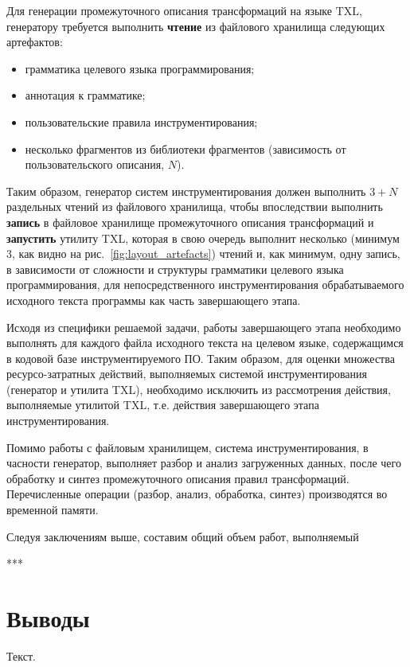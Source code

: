 Для генерации промежуточного описания трансформаций на языке TXL, генератору требуется выполнить \textbf{чтение} из файлового хранилища следующих артефактов:
\begin{itemize}
  \item грамматика целевого языка программирования;
  \item аннотация к грамматике;
  \item пользовательские правила инструментирования;
  \item несколько фрагментов из библиотеки фрагментов (зависимость от пользовательского описания, $N$).
\end{itemize}

Таким образом, генератор систем инструментирования должен выполнить $3 + N$ раздельных чтений из файлового хранилища, чтобы впоследствии выполнить \textbf{запись} в файловое хранилище промежуточного описания трансформаций и \textbf{запустить} утилиту TXL, которая в свою очередь выполнит несколько (минимум $3$, как видно на рис.~\ref{fig:layout_artefacts}) чтений и, как минимум, одну запись, в зависимости от сложности и структуры грамматики целевого языка программирования, для непосредственного инструментирования обрабатываемого исходного текста программы как часть завершающего этапа.

Исходя из специфики решаемой задачи, работы завершающего этапа необходимо выполнять для каждого файла исходного текста на целевом языке, содержащимся в кодовой базе инструментируемого ПО.
Таким образом, для оценки множества ресурсо-затратных действий, выполняемых системой инструментирования (генератор и утилита TXL), необходимо исключить из рассмотрения действия, выполняемые утилитой TXL, т.е. действия завершающего этапа инструментирования.

Помимо работы с файловым хранилищем, система инструментирования, в часности генератор, выполняет разбор и анализ загруженных данных, после чего обработку и синтез промежуточного описания правил трансформаций.
Перечисленные операции (разбор, анализ, обработка, синтез) производятся во временной памяти.

Следуя заключениям выше, составим общий объем работ, выполняемый

***


\section{Выводы}

Текст.
